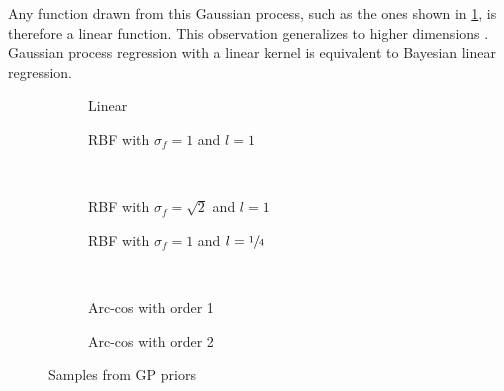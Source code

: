 Any function drawn from this Gaussian process, such as the ones shown in \cref{fig:gp:gp_samples:linear}, is therefore a linear function.
This observation generalizes to higher dimensions \cite{rasmussen_gaussian_2006}.
Gaussian process regression with a linear kernel is equivalent to Bayesian linear regression.
\begin{figure}[p]
    \begin{subfigure}[b]{\halffigurewidth}
        \centering
        \caption{
            Linear
            \label{fig:gp:gp_samples:linear}
        }
    \end{subfigure}
    \hfill
    \begin{subfigure}[b]{\halffigurewidth}
        \centering
        \caption{
            RBF with $\sigma_f = 1$ and $l=1$
            \label{fig:gp:gp_samples:rbf_normal}
        }
    \end{subfigure}\\[\figureskip]
    \begin{subfigure}[b]{\halffigurewidth}
        \centering
        \caption{
            RBF with $\sigma_f = \sqrt{2}$ and $l=1$
            \label{fig:gp:gp_samples:rbf_noisy}
        }
    \end{subfigure}
    \hfill
    \begin{subfigure}[b]{\halffigurewidth}
        \centering
        \caption{
            RBF with $\sigma_f = 1$ and $l = \sfrac{1}{4}$
            \label{fig:gp:gp_samples:rbf_lengthscale}
        }
    \end{subfigure}\\[\figureskip]
    \begin{subfigure}[b]{\halffigurewidth}
        \centering
        \caption{
            Arc-cos with order 1
            \label{fig:gp:gp_samples:arccos:1}
        }
    \end{subfigure}
    \hfill
    \begin{subfigure}[b]{\halffigurewidth}
        \centering
        \caption{
            Arc-cos with order 2
            \label{fig:gp:gp_samples:arccos:2}
        }
    \end{subfigure}
    \caption[Samples from GP priors]{
        Samples from GP priors
        \label{fig:gp:gp_samples}
    }
\end{figure}


